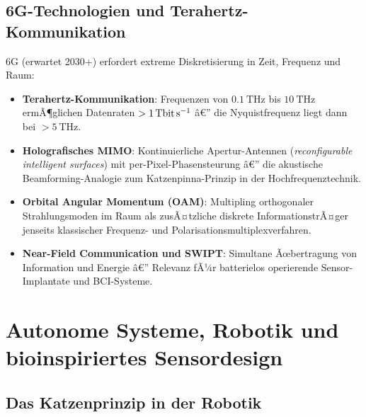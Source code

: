 ﻿\documentclass[12pt,a4paper,titlepage]{report}
\begin{document}
\subsection{6G-Technologien und Terahertz-Kommunikation}

6G (erwartet 2030+) erfordert extreme Diskretisierung in Zeit, Frequenz und Raum:
\begin{itemize}[leftmargin=2em]
    \item \textbf{Terahertz-Kommunikation}: Frequenzen von $\SI{0.1}{\tera\hertz}$
        bis $\SI{10}{\tera\hertz}$ ermÃ¶glichen Datenraten $> \SI{1}{\tera\bit\per\second}$ â€”
        die Nyquistfrequenz liegt dann bei $> \SI{5}{\tera\hertz}$.
    \item \textbf{Holografisches MIMO}: Kontinuierliche Apertur-Antennen
        (\emph{reconfigurable intelligent surfaces}) mit per-Pixel-Phasensteurung â€”
        die akustische Beamforming-Analogie zum Katzenpinna-Prinzip in der Hochfrequenztechnik.
    \item \textbf{Orbital Angular Momentum (OAM)}: Multipling orthogonaler
        Strahlungsmoden im Raum als zusÃ¤tzliche diskrete InformationstrÃ¤ger jenseits
        klassischer Frequenz- und Polarisationsmultiplexverfahren.
    \item \textbf{Near-Field Communication und SWIPT}: Simultane Ãœbertragung von
        Information und Energie â€” Relevanz fÃ¼r batterielos operierende
        Sensor-Implantate und BCI-Systeme.
\end{itemize}

\section{Autonome Systeme, Robotik und bioinspiriertes Sensordesign}

\subsection{Das Katzenprinzip in der Robotik}
\end{document}
